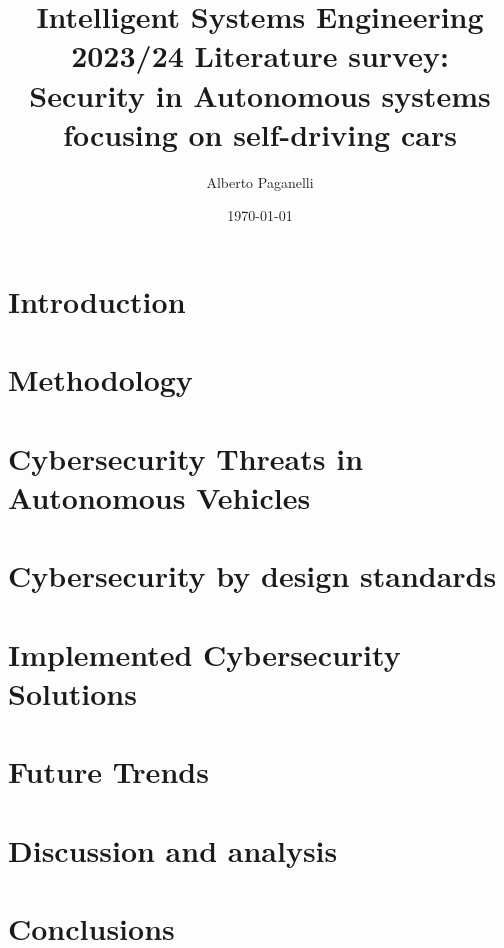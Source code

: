 \documentclass{scrartcl}
\title{\LARGE
Intelligent Systems Engineering 2023/24 \newline
\newline
Literature survey: \\
Security in Autonomous systems focusing on self-driving cars
}
\author{
    Alberto Paganelli \\ \emailaddr{alberto.paganelli3@studio.unibo.it}
}
\date{\today}
\begin{document}
    \maketitle
    \begin{abstract}
    
    \end{abstract}

    \newpage
    \tableofcontents
    \newpage

    \section{Introduction}\label{sec:introduction}
    
    \section{Methodology}\label{sec:methodology}
    

    \section{Cybersecurity Threats in Autonomous Vehicles}\label{sec:cybersecurity-threats-in-autonomous-vehicles}
    

    \section{Cybersecurity by design standards}\label{sec:cybersecurity-by-design-standards}
    

    \section{Implemented Cybersecurity Solutions}\label{sec:implemented-cybersecurity-solutions}
    

    \section{Future Trends}\label{sec:future-trends}
    

    \section{Discussion and analysis}\label{sec:discussion-and-analysis}
    

    \section{Conclusions}\label{sec:conclusions}
    

    ~\nocite{*}
    
    
\end{document}
